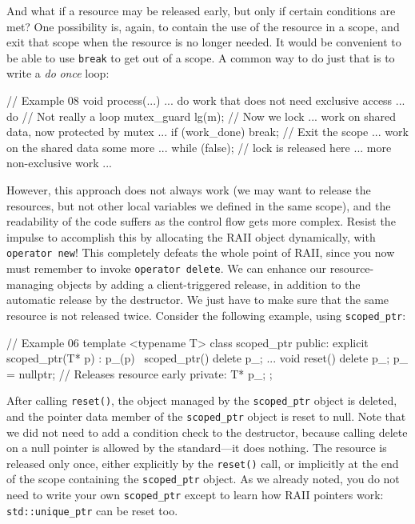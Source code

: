 And what if a resource may be released early, but only if certain conditions are met? One possibility is, again, to contain the use of the resource in a scope, and exit that scope when the resource is no longer needed. It would be convenient to be able to use \texttt{break} to get out of a scope. A common way to do just that is to write a \emph{do} \emph{once} loop:

\begin{code}
// Example 08
void process(...) {
  ... do work that does not need exclusive access ...
  do {    // Not really a loop
    mutex_guard lg(m);    // Now we lock
    ... work on shared data, now protected by mutex ...
    if (work_done) break;    // Exit the scope
    ... work on the shared data some more ...
  } while (false);        // lock is released here
  ... more non-exclusive work ...
}
\end{code}

However, this approach does not always work (we may want to release the resources, but not other local variables we defined in the same scope), and the readability of the code suffers as the control flow gets more complex. Resist the impulse to accomplish this by allocating the RAII object dynamically, with \texttt{operator\ new}! This completely defeats the whole point of RAII, since you now must remember to invoke \texttt{operator\ delete}. We can enhance our resource-managing objects by adding a client-triggered release, in addition to the automatic release by the destructor. We just have to make sure that the same resource is not released twice. Consider the following example, using \texttt{scoped\_ptr}:

\begin{code}
// Example 06
template <typename T> class scoped_ptr {
  public:
  explicit scoped_ptr(T* p) : p_(p) {}
  ~scoped_ptr() { delete p_; }
  ...
  void reset() {
    delete p_;
    p_ = nullptr;     // Releases resource early private:
  }
  T* p_;
};
\end{code}

After calling \texttt{reset()}, the object managed by the \texttt{scoped\_ptr} object is deleted, and the pointer data member of the \texttt{scoped\_ptr} object is reset to null. Note that we did not need to add a condition check to the destructor, because calling delete on a null pointer is allowed by the standard---it does nothing. The resource is released only once, either explicitly by the \texttt{reset()} call, or implicitly at the end of the scope containing the \texttt{scoped\_ptr} object. As we already noted, you do not need to write your own \texttt{scoped\_ptr} except to learn how RAII pointers work: \texttt{std::unique\_ptr} can be reset too.

